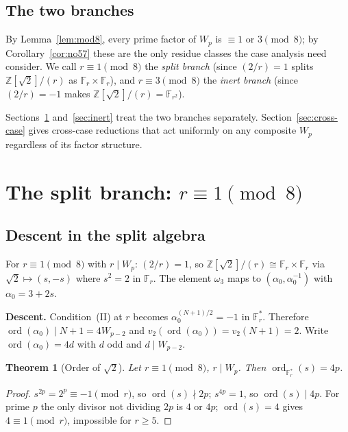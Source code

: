 \documentclass[11pt]{amsart}
\theoremstyle{plain}
\newtheorem{theorem}{Theorem}[section]
\theoremstyle{definition}
\theoremstyle{remark}
\numberwithin{equation}{section}
\newcommand{\ord}{\operatorname{ord}}
\newcommand{\Z}{\mathbb{Z}}
\newcommand{\F}{\mathbb{F}}
\begin{document}
\subsection{The two branches}

By Lemma~\ref{lem:mod8}, every prime factor of $W_p$ is $\equiv 1$ or $3 \pmod 8$; by Corollary~\ref{cor:no57} these are the only residue classes the case analysis need consider. We call $r \equiv 1 \pmod 8$ the \emph{split branch} (since $(2/r) = 1$ splits $\Z[\sqrt 2]/(r)$ as $\F_r \times \F_r$), and $r \equiv 3 \pmod 8$ the \emph{inert branch} (since $(2/r) = -1$ makes $\Z[\sqrt 2]/(r) = \F_{r^2}$).

Sections~\ref{sec:split} and~\ref{sec:inert} treat the two branches separately. Section~\ref{sec:cross-case} gives cross-case reductions that act uniformly on any composite $W_p$ regardless of its factor structure.

\section{The split branch: \texorpdfstring{$r \equiv 1 \pmod 8$}{r = 1 mod 8}}\label{sec:split}

\subsection{Descent in the split algebra}

For $r \equiv 1 \pmod 8$ with $r \mid W_p$: $(2/r) = 1$, so $\Z[\sqrt 2]/(r) \cong \F_r \times \F_r$ via $\sqrt 2 \mapsto (s, -s)$ where $s^2 = 2$ in $\F_r$. The element $\omega_3$ maps to $(\alpha_0, \alpha_0^{-1})$ with $\alpha_0 = 3 + 2 s$.

\textbf{Descent.} Condition~(II) at $r$ becomes $\alpha_0^{(N+1)/2} = -1$ in $\F_r^\ast$. Therefore $\ord(\alpha_0) \mid N + 1 = 4 W_{p-2}$ and $v_2(\ord(\alpha_0)) = v_2(N + 1) = 2$. Write $\ord(\alpha_0) = 4 d$ with $d$ odd and $d \mid W_{p-2}$.

\begin{theorem}[Order of $\sqrt 2$]\label{thm:ord-sqrt2}
Let $r \equiv 1 \pmod 8$, $r \mid W_p$. Then $\ord_{\F_r^\ast}(s) = 4p$.
\end{theorem}

\begin{proof}
$s^{2p} = 2^p \equiv -1 \pmod r$, so $\ord(s) \nmid 2p$; $s^{4p} = 1$, so $\ord(s) \mid 4p$. For prime $p$ the only divisor not dividing $2p$ is $4$ or $4p$; $\ord(s) = 4$ gives $4 \equiv 1 \pmod r$, impossible for $r \geq 5$.
\end{proof}
\end{document}
